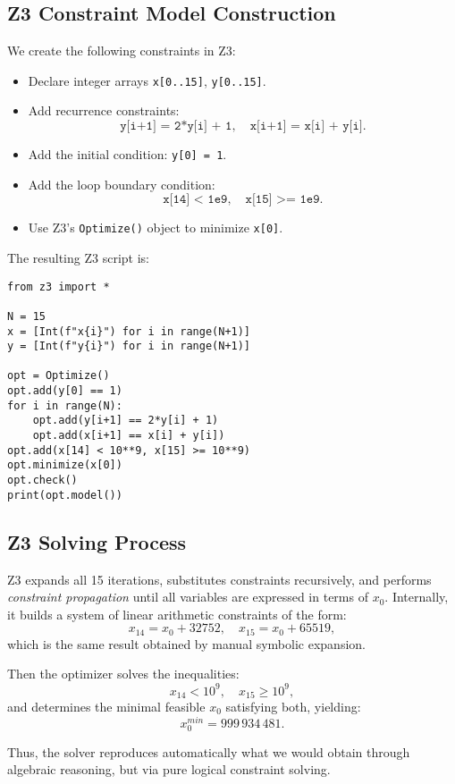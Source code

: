 \documentclass[a4paper,11pt]{article}
\begin{document}
\subsection*{Z3 Constraint Model Construction}

We create the following constraints in Z3:
\begin{itemize}
  \item Declare integer arrays \texttt{x[0..15]}, \texttt{y[0..15]}.
  \item Add recurrence constraints:
  \[
  \texttt{y[i+1] = 2*y[i] + 1}, \quad
  \texttt{x[i+1] = x[i] + y[i]}.
  \]
  \item Add the initial condition: \texttt{y[0] = 1}.
  \item Add the loop boundary condition:
  \[
  \texttt{x[14] < 1e9}, \quad \texttt{x[15] >= 1e9}.
  \]
  \item Use Z3's \texttt{Optimize()} object to minimize \texttt{x[0]}.
\end{itemize}

The resulting Z3 script is:

\begin{verbatim}
from z3 import *

N = 15
x = [Int(f"x{i}") for i in range(N+1)]
y = [Int(f"y{i}") for i in range(N+1)]

opt = Optimize()
opt.add(y[0] == 1)
for i in range(N):
    opt.add(y[i+1] == 2*y[i] + 1)
    opt.add(x[i+1] == x[i] + y[i])
opt.add(x[14] < 10**9, x[15] >= 10**9)
opt.minimize(x[0])
opt.check()
print(opt.model())
\end{verbatim}

\subsection*{Z3 Solving Process}

Z3 expands all 15 iterations, substitutes constraints recursively, and performs
\emph{constraint propagation} until all variables are expressed in terms of \(x_0\).
Internally, it builds a system of linear arithmetic constraints of the form:
\[
x_{14} = x_0 + 32752,\quad x_{15} = x_0 + 65519,
\]
which is the same result obtained by manual symbolic expansion.

Then the optimizer solves the inequalities:
\[
x_{14} < 10^9, \quad x_{15} \ge 10^9,
\]
and determines the minimal feasible \(x_0\) satisfying both, yielding:
\[
\boxed{x_0^{min} = 999\,934\,481.}
\]

Thus, the solver reproduces automatically what we would obtain
through algebraic reasoning, but via pure logical constraint solving.
\end{document}

